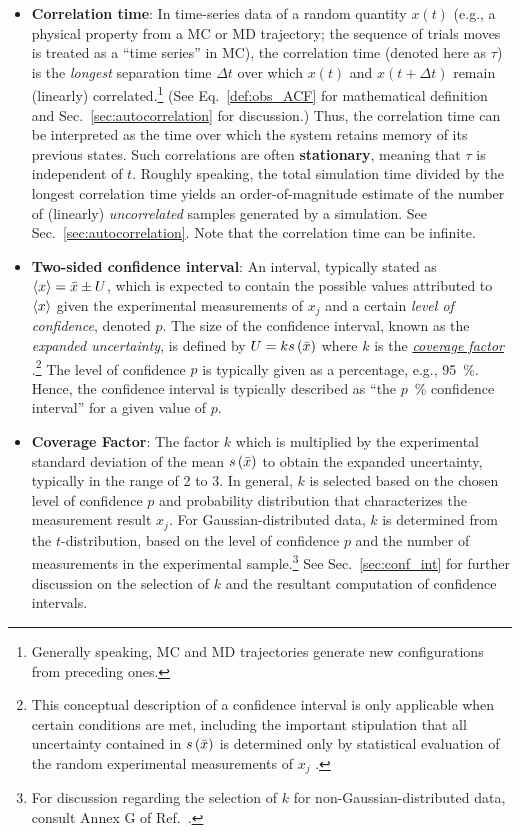 \begin{itemize}
\item {\bf Correlation time}: In time-series data of a random quantity $x(t)$ (e.g., a physical property from a MC or MD trajectory; the sequence of trials moves is treated as a ``time series'' in MC), the correlation time (denoted here as $\tau$) is the {\it longest} separation time $\Delta t$ over which $x(t)$ and $x(t+\Delta t)$ remain (linearly) correlated.\footnote{Generally speaking, MC and MD trajectories generate new configurations from preceding ones.} (See Eq.~\ref{def:obs_ACF} for mathematical definition and Sec.~\ref{sec:autocorrelation} for discussion.)
Thus, the correlation time can be interpreted as the time over which the system retains memory of its previous states.
Such correlations are often {\bf stationary}, meaning that $\tau$ is independent of $t$.
Roughly speaking, the total simulation time divided by the longest correlation time yields an order-of-magnitude estimate of the number of (linearly) {\it uncorrelated} samples generated by a simulation. See Sec.~\ref{sec:autocorrelation}.  Note that the correlation time can be infinite.
\label{def:corr_time}

\item {\bf Two-sided confidence interval}: An interval, typically stated as $\langle x \rangle = \bar{x} \pm U$, which is expected to contain the possible values attributed to $\langle x \rangle$ given the experimental measurements of $x_j$ and a certain {\it level of confidence}, denoted $p$.
  The size of the confidence interval, known as the {\it expanded uncertainty}, is defined by $U = k s\left( \bar{x} \right)$ where $k$ is the \hyperref[def:coveragefactor]{\it coverage factor} \cite{JCGM:VIM2012}.\footnote{This conceptual description of a confidence interval is only applicable when certain conditions are met, including the important stipulation that all uncertainty contained in $s\left( \bar{x} \right)$ is determined only by statistical evaluation of the random experimental measurements of $x_j$ \cite{JCGM:GUM2008}.}
  The level of confidence $p$ is typically given as a percentage, e.g., 95~\%. Hence, the confidence interval is typically described as ``the $p$~\% confidence interval'' for a given value of $p$.
  \label{def:conf_int}

\item {\bf Coverage Factor}:
  The factor $k$ which is multiplied by the experimental standard deviation of the mean \hyperref[def:exp_st_dev_mean]{$s\left( \bar{x} \right)$} to obtain the expanded uncertainty, typically in the range of 2 to 3. In general, $k$ is selected based on the chosen level of confidence $p$ and probability distribution that characterizes the measurement result $x_j$. For Gaussian-distributed data, $k$ is determined from the $t$-distribution, based on the level of confidence $p$ and the number of measurements in the experimental sample.\footnote{For discussion regarding the selection of $k$ for non-Gaussian-distributed data, consult Annex G of Ref.~\cite{JCGM:GUM2008}.} See Sec.~\ref{sec:conf_int} for further discussion on the selection of $k$ and the resultant computation of confidence intervals.
  \label{def:coveragefactor}

\end{itemize}

